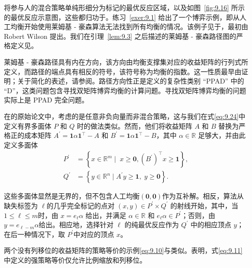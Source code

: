 将参与人的混合策略单纯形细分为标记的最优反应区域，以及如图~\ref{fig:9.16} 所示的最优反应示意图，这些都归功于\citet{shapley1974}。练习~\ref{exer:9.1} 给出了一个博弈示例，即从人工均衡开始使用莱姆基 - 豪森算法无法找到所有均衡的情况。该例子见于\citet[Figure~3]{shapley1974}，最初由 Robert Wilson 提出。我们在引理~\ref{lem:9.3} 之后描述的莱姆基 - 豪森路径图的严格定义见\citet{vonstengel2002}。


莱姆基 - 豪森路径具有内在方向，该方向由均衡支撑集对应的收益矩阵的行列式所定义，而路径的端点具有相反的符号，该符号称为均衡的指数。这一性质最早由\citet{shapley1974}证明；关于简化的表述，请参阅\citet{vonstengel2021}。路径方向性正是\citet{papadimitriou1994}定义的复杂性类别 “PPAD” 中的 “D”，这类问题包含寻找双矩阵博弈均衡的计算问题。寻找双矩阵博弈均衡的问题实际上是 PPAD 完全问题\citep*{chen2009}。



在\citet{lemke1964}的原始论文中，考虑的是任意非负向量而非混合策略，这与我们在式\eqref{eq:9.24}中定义有界多面体 \(P\) 和 \(Q\) 时的做法类似。然而，他们将收益矩阵 \(A\) 和 \(B\) 替换为严格正的成本矩阵 \({A}^{\prime } = \mathbf{1}\alpha {\mathbf{1}}^{\top } - A\) 和 \({B}^{\prime } = \mathbf{1}\alpha {\mathbf{1}}^{\top } - B\)，其中 \(\alpha  \in  \mathbb{R}\) 足够大，并由此定义多面体
\begin{equation*}
\begin{aligned}
{P}^{\prime } & = \left\{  {x \in  {\mathbb{R}}^{m} \mid  \;x \geq  \mathbf{0},{\left( {B}^{\prime }\right) }^{\top }x \geq  \mathbf{1}}\right\}, \\
{Q}^{\prime } & = \left\{  {y \in  {\mathbb{R}}^{n} \mid  {A}^{\prime }y \geq  \mathbf{1},\;y \geq  \mathbf{0}}\right\}  .
\end{aligned}
\end{equation*}

这些多面体显然是无界的，但不包含人工均衡$(\mathbf{0},\mathbf{0})$作为互补解。相反，算法从缺失标签为 \(\ell\)的几乎完全标记的点对 \(\left( {x,y}\right)  \in  {P}^{\prime } \times  {Q}^{\prime }\) 的射线开始，其中，当\(1 \leq  \ell  \leq  m\)时，由 \(x = {e}_{\ell }\alpha\) 给出，并满足 \(\alpha  \in  \mathbb{R}\) 和 \({e}_{\ell }\alpha  \in  {P}^{\prime }\)；否则，由 \(y = {e}_{\ell  - m}\alpha\)给出。相应地，选择针对 \(\ell\) 的纯最优反应作为 \({Q}^{\prime }\) 中的相应顶点 \(y\)；在后一种情况下，取 \({P}^{\prime }\)中对应的顶点 \(x\)。



两个没有列移位的收益矩阵的策略等价的示例\eqref{eq:9.10}与\citet[Example~2.1]{liu1996}类似。\citet{moulin1978}表明，式\eqref{eq:9.11}中定义的强策略等价仅允许比例缩放和列移位。


